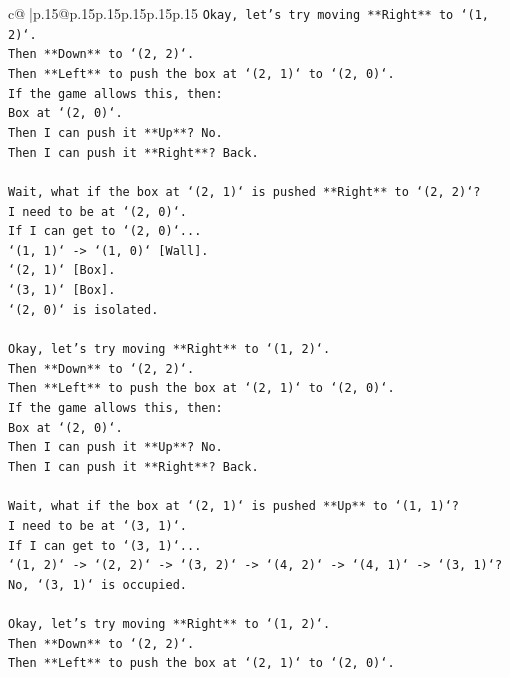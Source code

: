 \documentclass{article}
\begin{document}
{\begin{supertabular}{c@{$\;$}|p{.15\linewidth}@{}p{.15\linewidth}p{.15\linewidth}p{.15\linewidth}p{.15\linewidth}p{.15\linewidth}}
{{{\texttt{Okay, let's try moving **Right** to `(1, 2)`.} \\
\texttt{Then **Down** to `(2, 2)`.} \\
\texttt{Then **Left** to push the box at `(2, 1)` to `(2, 0)`.} \\
\texttt{If the game allows this, then:} \\
\texttt{Box at `(2, 0)`.} \\
\texttt{Then I can push it **Up**? No.} \\
\texttt{Then I can push it **Right**? Back.} \\
\\ 
\texttt{Wait, what if the box at `(2, 1)` is pushed **Right** to `(2, 2)`?} \\
\texttt{I need to be at `(2, 0)`.} \\
\texttt{If I can get to `(2, 0)`...} \\
\texttt{`(1, 1)` {-}> `(1, 0)` {[}Wall{]}.} \\
\texttt{`(2, 1)` {[}Box{]}.} \\
\texttt{`(3, 1)` {[}Box{]}.} \\
\texttt{`(2, 0)` is isolated.} \\
\\ 
\texttt{Okay, let's try moving **Right** to `(1, 2)`.} \\
\texttt{Then **Down** to `(2, 2)`.} \\
\texttt{Then **Left** to push the box at `(2, 1)` to `(2, 0)`.} \\
\texttt{If the game allows this, then:} \\
\texttt{Box at `(2, 0)`.} \\
\texttt{Then I can push it **Up**? No.} \\
\texttt{Then I can push it **Right**? Back.} \\
\\ 
\texttt{Wait, what if the box at `(2, 1)` is pushed **Up** to `(1, 1)`?} \\
\texttt{I need to be at `(3, 1)`.} \\
\texttt{If I can get to `(3, 1)`...} \\
\texttt{`(1, 2)` {-}> `(2, 2)` {-}> `(3, 2)` {-}> `(4, 2)` {-}> `(4, 1)` {-}> `(3, 1)`? No, `(3, 1)` is occupied.} \\
\\ 
\texttt{Okay, let's try moving **Right** to `(1, 2)`.} \\
\texttt{Then **Down** to `(2, 2)`.} \\
\texttt{Then **Left** to push the box at `(2, 1)` to `(2, 0)`.} \\
}}}
\end{supertabular}}
\end{document}
